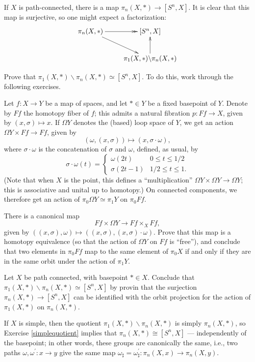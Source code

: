 If $X$ is path-connected, there is a map $\pi_n(X,\ast)\to [S^n,X]$.
It is clear that this map is surjective,
so one might expect a factorization:
\begin{equation*}
    \xymatrix{
	\pi_n(X,\ast)\ar@{->>}[r]\ar[dr] & [S^n,X]\\
	& \pi_1(X,\ast)\backslash \pi_n(X,\ast)\ar[u]
	}
\end{equation*}
\begin{exercise}\label{simplequotient}
    Prove that $\pi_1(X,\ast)\backslash \pi_n(X,\ast) \simeq [S^n, X]$.
    To do this, work through the following exercises.
    
    Let $f:X\to Y$ be a map of spaces, and let $\ast\in Y$ be a fixed basepoint of $Y$.
    Denote by $Ff$ the homotopy fiber of $f$; this admits a natural fibration $p:Ff \to X$, given by $(x,\sigma)\mapsto x$.
    If $\Omega Y$ denotes the (based) loop space of $Y$, we get an action $\Omega Y \times Ff \to Ff$, given by
    $$(\omega,(x,\sigma)) \mapsto (x,\sigma\cdot\omega),$$
    where $\sigma\cdot\omega$ is the concatenation of $\sigma$ and $\omega$, defined, as usual, by
    $$
    \sigma\cdot\omega(t) = \begin{cases}
	\omega(2t) & 0\leq t\leq 1/2\\
	\sigma(2t-1) & 1/2\leq t\leq 1.
    \end{cases}
    $$
    (Note that when $X$ is the point, this defines a ``multiplication'' $\Omega Y \times \Omega Y \to \Omega Y$; this is 
    associative and unital up to homotopy.)
    On connected components, we therefore get an action of $\pi_0\Omega Y \simeq \pi_1 Y$ on $\pi_0 Ff$.

    There is a canonical map
    $$Ff \times \Omega Y \to Ff\times_X Ff,$$
    given by $((x,\sigma),\omega) \mapsto ((x,\sigma),(x,\sigma)\cdot\omega)$.
    Prove that this map is a homotopy equivalence (so that the action of $\Omega Y$ on $Ff$ is ``free''), and conclude that
    two elements in $\pi_0 Ff$ map to the same element of $\pi_0 X$ if and only if they are in the same orbit under the action
    of $\pi_1 Y$.

    Let $X$ be path connected, with basepoint $\ast\in X$.
    Conclude that $\pi_1(X,\ast)\backslash \pi_n(X,\ast) \simeq [S^n,X]$ by provin that the surjection
    $\pi_n(X,\ast) \to [S^n,X]$ can be identified with the orbit projection for the action of $\pi_1(X,\ast)$ on $\pi_n(X,\ast)$.
\end{exercise}
If $X$ is simple, then the quotient $\pi_1(X,\ast)\backslash \pi_n(X,\ast)$ is simply $\pi_n(X, \ast)$, so
Exercise \ref{simplequotient} implies that $\pi_n(X,\ast)\cong [S^n,X]$ --- independently of the basepoint;
in other words, these groups are canonically the same, i.e., two paths $\omega,\omega^\prime:x\to y$ give the
same map $\omega_\sharp = \omega^\prime_\sharp:\pi_n(X,x)\to \pi_n(X,y)$.

